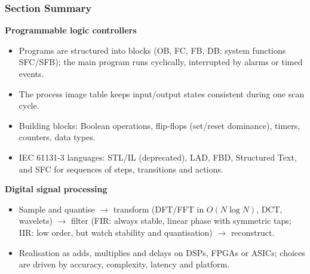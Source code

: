 \begin{frame}
	\frametitle{Section Summary}
	\small
	\textbf{Programmable logic controllers}
	\begin{itemize}
		\item Programs are structured into blocks (OB, FC, FB, DB; system functions SFC/SFB); the main program runs cyclically, interrupted by alarms or timed events.
		\item The process image table keeps input/output states consistent during one scan cycle.
		\item Building blocks: Boolean operations, flip-flops (set/reset dominance), timers, counters, data types.
		\item IEC 61131-3 languages: STL/IL (deprecated), LAD, FBD, Structured Text, and SFC for sequences of steps, transitions and actions.
	\end{itemize}
	\textbf{Digital signal processing}
	\begin{itemize}
		\item Sample and quantise $\rightarrow$ transform (DFT/FFT in $O(N \log N)$, DCT, wavelets) $\rightarrow$ filter (FIR: always stable, linear phase with symmetric taps; IIR: low order, but watch stability and quantisation) $\rightarrow$ reconstruct.
		\item Realisation as adds, multiplies and delays on DSPs, FPGAs or ASICs; choices are driven by accuracy, complexity, latency and platform.
	\end{itemize}
\end{frame}
